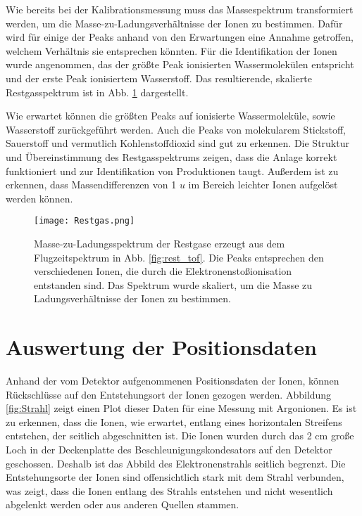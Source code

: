 Wie bereits bei der Kalibrationsmessung muss das Massespektrum transformiert werden, um die Masse-zu-Ladungsverhältnisse der Ionen zu bestimmen. Dafür wird für einige der Peaks anhand von den Erwartungen eine Annahme getroffen, welchem Verhältnis sie entsprechen könnten. Für die Identifikation der Ionen wurde angenommen, das der größte Peak ionisierten Wassermolekülen
entspricht und der erste Peak ionisiertem Wasserstoff. Das resultierende, skalierte Restgasspektrum ist in Abb. \ref{fig:rest} dargestellt.

Wie erwartet können die größten Peaks auf ionisierte Wassermoleküle, sowie Wasserstoff zurückgeführt werden. Auch die Peaks von molekularem Stickstoff, Sauerstoff und vermutlich Kohlenstoffdioxid sind gut zu erkennen. Die Struktur und Übereinstimmung des Restgasspektrums zeigen, dass die Anlage korrekt funktioniert und zur Identifikation von Produktionen taugt. Außerdem ist zu erkennen, dass Massendifferenzen von 1 $u$ im Bereich leichter Ionen aufgelöst werden können. 

\begin{figure}[h]
    \centering
    \hspace*{-1cm}
    \texttt{[image: Restgas.png]}
    \caption[Masse-zu-Ladungsspektrum der Restgase]{Masse-zu-Ladungsspektrum der Restgase erzeugt aus dem Flugzeitspektrum in Abb. \ref{fig:rest_tof}. Die Peaks entsprechen den verschiedenen Ionen, die durch die Elektronenstoßionisation entstanden sind. Das Spektrum wurde skaliert, um die Masse zu Ladungsverhältnisse der Ionen zu bestimmen.}
    \label{fig:rest}
\end{figure}

\section{Auswertung der Positionsdaten}
Anhand der vom Detektor aufgenommenen Positionsdaten der Ionen, können Rückschlüsse auf den Entstehungsort der Ionen gezogen werden. Abbildung \ref{fig:Strahl} zeigt einen Plot dieser Daten für eine Messung mit Argonionen. Es ist zu erkennen, dass die Ionen, wie erwartet, entlang eines horizontalen Streifens entstehen, der seitlich abgeschnitten ist. Die Ionen wurden durch das 2 cm große Loch in der Deckenplatte des Beschleunigungskondesators auf den Detektor geschossen. Deshalb ist das Abbild des Elektronenstrahls seitlich begrenzt. Die Entstehungsorte der Ionen sind offensichtlich stark mit dem Strahl verbunden, was zeigt, dass die Ionen entlang des Strahls entstehen und nicht wesentlich abgelenkt werden oder aus anderen Quellen stammen.

